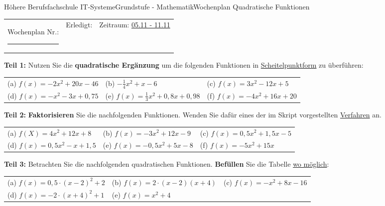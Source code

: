 \documentclass[oneside,openany,headings=optiontotoc,11pt,numbers=noenddot]{scrreprt}
\begin{document}
	\begin{worksheet}{Höhere Berufsfachschule IT-Systeme}{Grundstufe - Mathematik}{Wochenplan Quadratische Funktionen}
		\noindent
		\begin{tabularx}{\textwidth}{XXl}
			Wochenplan Nr.: \rule{0.15\textwidth}{1pt} & Erledigt: & Zeitraum: \underline{05.11 - 11.11}
		\end{tabularx}
	
		\begin{framed}
			\noindent
			\textbf{Teil 1:} Nutzen Sie die \textbf{quadratische Ergänzung} um die folgenden Funktionen in \underline{Scheitelpunktform} zu überführen:\\
			\par\noindent
			\begin{tabularx}{\textwidth}{XXX}
				(a) \(f(x) = -2x^2 + 20x -46\) & (b) \(-\frac{1}{4}x^2+x-6\) & (c) \(f(x) = 3x^2-12x+5\)\\
				(d) \(f(x) = -x^2-3x+0,75\) & (e) \(f(x) = \frac{1}{3}x^2 +0,8x + 0,98\) & (f) \(f(x) = -4x^2+16x+20\)\\
			\end{tabularx}
		\end{framed}
		\begin{framed}
			\noindent
			\textbf{Teil 2:} \textbf{Faktorisieren} Sie die nachfolgenden Funktionen. Wenden Sie dafür eines der im Skript vorgestellten \underline{Verfahren} an.\\
			\par\noindent
			\begin{tabularx}{\textwidth}{XXX}
				(a) \( f(X) = 4x^2 +12x+8\) & (b) \(f(x) = -3x^2 + 12x -9\) & (c) \(f(x) = 0,5x^2+1,5x-5\)\\
				(d) \(f(x) = 0,5x^2 - x +1,5\) & (e) \(f(x) = -0,5x^2 + 5x -8\) & (f) \(f(x) = -5x^2 + 15x\)
			\end{tabularx}
		\end{framed}
		\begin{framed}
			\noindent
			\textbf{Teil 3:} Betrachten Sie die nachfolgenden quadratischen Funktionen. \textbf{Befüllen} Sie die Tabelle \underline{wo möglich}:\\
			\par\noindent
			\begin{tabularx}{\textwidth}{XXX}
				(a) \(f(x) = 0,5\cdot(x-2)^2 + 2\) & (b) \(f(x) = 2\cdot(x-2)(x+4)\) & (c) \(f(x) = -x^2+8x-16\)\\
				(d) \(f(x) = -2\cdot(x+4)^2+1\) &(e) \(f(x) = x^2 + 4\)\\

\end{tabularx}
\end{framed}
\end{worksheet}
\end{document}
